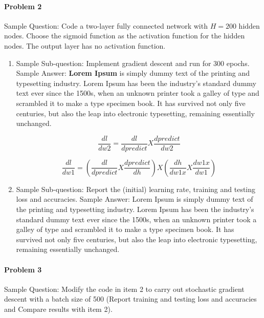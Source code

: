 \documentclass[11pt]{scrartcl}
\begin{document}
{\paragraph*{Problem 2}
Sample Question: Code a two-layer fully connected network with $H = 200$ hidden nodes. Choose the sigmoid function as the activation function for the hidden nodes. The output layer has no activation function.
\begin{enumerate}[label=(\alph*)]
\item Sample Sub-question: Implement gradient descent and run for 300 epochs.
\newline Sample Answer: \textbf{Lorem Ipsum} is simply dummy text of the printing and typesetting industry. Lorem Ipsum has been the industry's standard dummy text ever since the 1500s, when an unknown printer took a galley of type and scrambled it to make a type specimen book. It has survived not only five centuries, but also the leap into electronic typesetting, remaining essentially unchanged.

\begin{equation}
    \frac{dl}{dw2} = \frac{dl}{dpredict} X \frac{dpredict}{dw2}
\end{equation}

\begin{equation}
    \frac{dl}{dw1} = (\frac{dl}{dpredict}X\frac{dpredict}{dh})X(\frac{dh}{dw1x}X\frac{dw1x}{dw1})
\end{equation}

\item Sample Sub-question: Report the (initial) learning rate, training and testing loss and accuracies.
\newline Sample Answer: Lorem Ipsum is simply dummy text of the printing and typesetting industry. Lorem Ipsum has been the industry's standard dummy text ever since the 1500s, when an unknown printer took a galley of type and scrambled it to make a type specimen book. It has survived not only five centuries, but also the leap into electronic typesetting, remaining essentially unchanged.
\end{enumerate}


\paragraph*{Problem 3}
Sample Question: Modify the code in item 2 to carry out stochastic gradient descent with a batch size of 500 (Report training and testing loss and accuracies and Compare results with item 2).

}
\end{document}
